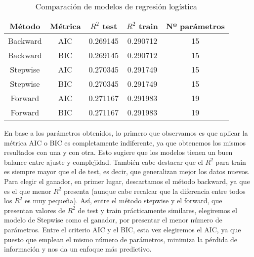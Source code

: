 \documentclass[a4paper,onecolumn]{extarticle}
\begin{document}
\begin{sloppypar}
\begin{table}[h!]
    \begin{center}
        \begin{tabular}{ |c|c|c|c|c| } 
        \hline
        \textbf{Método} & \textbf{Métrica} & \textbf{$R^{2}$ test} & \textbf{$R^{2}$ train} & \textbf{Nº parámetros} \\
        \hline 
        Backward & AIC & 0.269145 & 0.290712 & 15 \\ 
        Backward & BIC & 0.269145 & 0.290712 & 15 \\ 
        Stepwise & AIC & 0.270345 & 0.291749 & 15 \\ 
        Stepwise & BIC & 0.270345 & 0.291749 & 15 \\ 
        Forward & AIC & 0.271167 & 0.291983 & 19 \\ 
        Forward & BIC & 0.271167 & 0.291983 & 19 \\ 
        \hline
        \end{tabular}
        \caption{Comparación de modelos de regresión logística}
        \label{table:tablalogistica}
    \end{center}
\end{table}

En base a los parámetros obtenidos, lo primero que observamos es que aplicar la métrica AIC o BIC es completamente indiferente, ya que obtenemos los mismos 
resultados con una y con otra. Esto sugiere que los modelos tienen un buen balance entre ajuste y complejidad. También cabe destacar que el $R^2$ para train 
es siempre mayor que el de test, es decir, que generalizan mejor los datos nuevos. Para elegir el ganador, en primer lugar, descartamos el método backward, ya 
que es el que menor $R^2$ presenta (aunque cabe recalcar que la diferencia entre todos los $R^2$ es muy pequeña). Así, entre el método stepwise y el forward,
que presentan valores de $R^2$ de test y train prácticamente similares, elegiremos el modelo de Stepwise como el ganador, por presentar el menor número de 
parámetros. Entre el criterio AIC y el BIC, esta vez elegiremos el AIC, ya que puesto que emplean el mismo número de parámetros, minimiza la pérdida de 
información y nos da un enfoque más predictivo.


\end{sloppypar}
\end{document}
